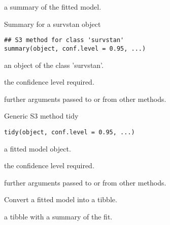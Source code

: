 \documentclass[letterpaper]{book}
\begin{document}
%
\begin{Value}
a summary of the fitted model.
\end{Value}
%
\begin{Description}\relax
Summary for a survstan object
\end{Description}
%
\begin{Usage}
\begin{verbatim}
## S3 method for class 'survstan'
summary(object, conf.level = 0.95, ...)
\end{verbatim}
\end{Usage}
%
\begin{Arguments}
\begin{ldescription}
\item[\code{object}] an object of the class 'survstan'.

\item[\code{conf.level}] the confidence level required.

\item[\code{...}] further arguments passed to or from other methods.
\end{ldescription}
\end{Arguments}
%
\begin{Description}\relax
Generic S3 method tidy
\end{Description}
%
\begin{Usage}
\begin{verbatim}
tidy(object, conf.level = 0.95, ...)
\end{verbatim}
\end{Usage}
%
\begin{Arguments}
\begin{ldescription}
\item[\code{object}] a fitted model object.

\item[\code{conf.level}] the confidence level required.

\item[\code{...}] further arguments passed to or from other methods.
\end{ldescription}
\end{Arguments}
%
\begin{Details}\relax
Convert a fitted model into a tibble.
\end{Details}
%
\begin{Value}
a tibble with a summary of the fit.
\end{Value}
\end{document}
